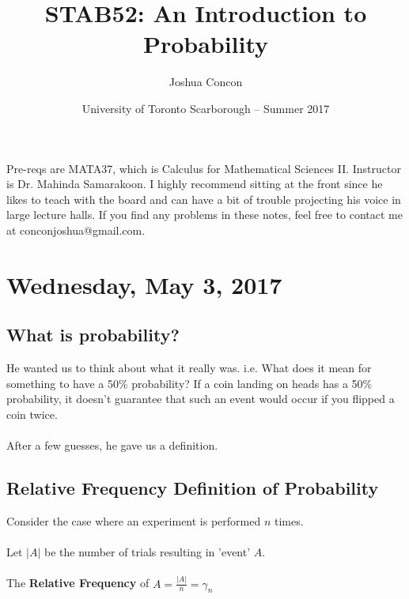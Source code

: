 \documentclass[12pt]{article}
\begin{document}
\title{STAB52: An Introduction to Probability}
\date{University of Toronto Scarborough -- Summer 2017}
\author{Joshua Concon}
\maketitle

Pre-reqs are MATA37, which is Calculus for Mathematical Sciences II.
Instructor is Dr. Mahinda Samarakoon. I highly recommend sitting at the front since he likes to teach with the board and can have a bit of trouble projecting his voice in large lecture halls. If you find any problems in these notes, feel free to contact me at conconjoshua@gmail.com.

\tableofcontents

\pagebreak

\section{Wednesday, May 3, 2017}

\subsection{What is probability?}

He wanted us to think about what it really was. i.e. What does it mean for something to have a 50\% probability? If a coin landing on heads has a 50\% probability, it doesn't guarantee that such an event would occur if you flipped a coin twice.\\
\\
After a few guesses, he gave us a definition.

\subsection{Relative Frequency Definition of Probability}

\begin{tcolorbox}[title=Relative Frequency]

Consider the case where an experiment is performed $n$ times.\\
\\
Let $|A|$ be the number of trials resulting in 'event' $A$.\\
\\
The \textbf{Relative Frequency} of $A = \frac{|A|}{n} = \gamma_n$\\

\end{tcolorbox}
\end{document}
